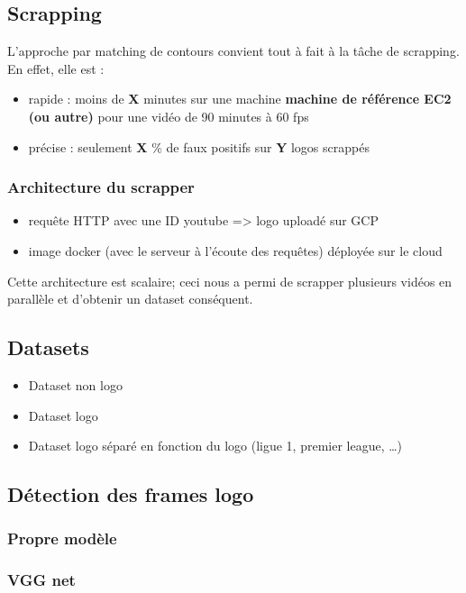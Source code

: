 \documentclass[11pt]{article}
\begin{document}
\subsection{Scrapping}
\label{sec-8-2}
L'approche par matching de contours convient tout à fait à la tâche de scrapping.
En effet, elle est :
\begin{itemize}
\item rapide : moins de \textbf{X} minutes sur une machine \textbf{machine de référence EC2 (ou autre)} pour une vidéo de 90 minutes à 60 fps
\item précise : seulement \textbf{X} \% de faux positifs sur \textbf{Y} logos scrappés
\end{itemize}

\subsubsection{Architecture du scrapper}
\label{sec-8-2-1}
\begin{itemize}
\item requête HTTP avec une ID youtube => logo uploadé sur GCP
\item image docker (avec le serveur à l'écoute des requêtes) déployée sur le cloud
\end{itemize}
Cette architecture est scalaire; ceci nous a permi de scrapper plusieurs vidéos en parallèle et d'obtenir un dataset conséquent.

\subsection{Datasets}
\label{sec-8-3}
\begin{itemize}
\item Dataset non logo
\item Dataset logo
\item Dataset logo séparé en fonction du logo (ligue 1, premier league, \ldots{})
\end{itemize}


\subsection{Détection des frames logo}
\label{sec-8-4}
\subsubsection{Propre modèle}
\label{sec-8-4-1}
\subsubsection{VGG net}
\label{sec-8-4-2}
\end{document}
